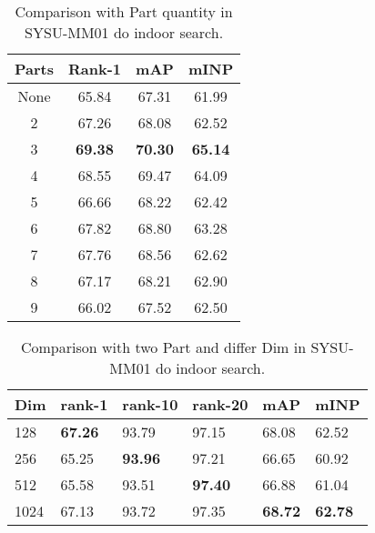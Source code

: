 \documentclass[journal]{IEEEtran}
\begin{document}
\begin{table}[]
	\centering	
	\normalsize 
	\caption{Comparison with Part quantity in SYSU-MM01 do indoor search.}
	\label{tab3}
	\begin{tabular}{c|ccc}
		\hline	
		Parts & \multicolumn{1}{c|}{Rank-1} & \multicolumn{1}{c|}{mAP} & mINP   \\ \hline
		None  & 65.84                       & 67.31                    & 61.99  \\
		2     & 67.26                       & 68.08                    & 62.52  \\
		3     & \textbf{69.38}                       & \textbf{70.30}                    & \textbf{65.14}  \\
		4     & 68.55                       & 69.47                    & 64.09  \\
		5     & 66.66                       & 68.22                    & 62.42  \\
		6     & 67.82                       & 68.80                    & 63.28 \\
		7     & 67.76                       & 68.56                    & 62.62  \\
		8     & 67.17                       & 68.21                    & 62.90  \\
		9     & 66.02                       & 67.52                    & 62.50  \\ 
	\hline
	\end{tabular}
\end{table}

\begin{table}[]
	\centering	
	\normalsize 
	\caption{Comparison with two Part and differ Dim in SYSU-MM01 do indoor search.}
	\label{tab4}
	\begin{tabular}{l|lllll}
		\hline
		Dim  & \multicolumn{1}{l|}{rank-1} & \multicolumn{1}{l|}{rank-10} & \multicolumn{1}{l|}{rank-20} & \multicolumn{1}{l|}{mAP} & mINP  \\ \hline
		128  & \textbf{67.26}                       & 93.79                        & 97.15                        & 68.08                    & 62.52 \\
		256  & 65.25                       & \textbf{93.96}                        & 97.21                        & 66.65                    & 60.92 \\
		512  & 65.58                       & 93.51                        & \textbf{97.40}                        & 66.88                    & 61.04 \\
		1024 & 67.13                       & 93.72                        & 97.35                        & \textbf{68.72}                    & \textbf{62.78}  \\ \hline
	
	\end{tabular}
\end{table}
\end{document}
